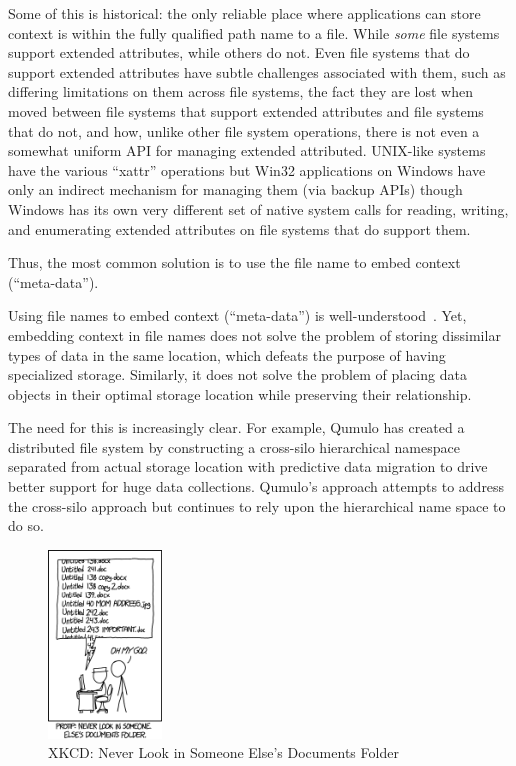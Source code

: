 Some of this is historical: the only reliable place where applications can store
context is within the fully qualified path name to a file.  While \emph{some} file systems
support extended attributes, while others do not.  Even file systems that do
support extended attributes have subtle challenges associated with them,
such as differing limitations on them across file systems, the fact they are
lost when moved between file systems that support extended attributes and file
systems that do not, and how, unlike other file system operations, there is not
even a somewhat uniform API for managing extended attributed.  UNIX-like systems
have the various ``xattr'' operations but Win32 applications on Windows have
only an indirect mechanism for managing them (via backup APIs) though Windows
has its own very different set of native system calls for reading, writing, and
enumerating extended attributes on file systems that do support them.

Thus, the most common solution is to use the file name to embed context
(``meta-data''). 


Using file names to
embed context (``meta-data'') is well-understood~\cite{guo2012burrito}.  Yet,
embedding context in file names does not solve the problem of storing dissimilar
types of data in the same location, which defeats the purpose of having
specialized storage.  Similarly, it does not solve the problem of placing data
objects in their optimal storage location while preserving their relationship.

The need for this is increasingly clear.  For example, Qumulo has created a
distributed file system by constructing a cross-silo hierarchical namespace
separated from actual storage location with predictive data migration to drive
better support for huge data collections. Qumulo's approach attempts to address
the cross-silo approach but continues to rely upon the hierarchical name space
to do so.

\begin{figure}[!tbh]
    \centering
    \includegraphics[height=5cm]{chapters/figures/xkcd1459.png}
    \caption{XKCD: Never Look in Someone Else's Documents Folder}
    \label{fig:xkcd:1459}
\end{figure}

